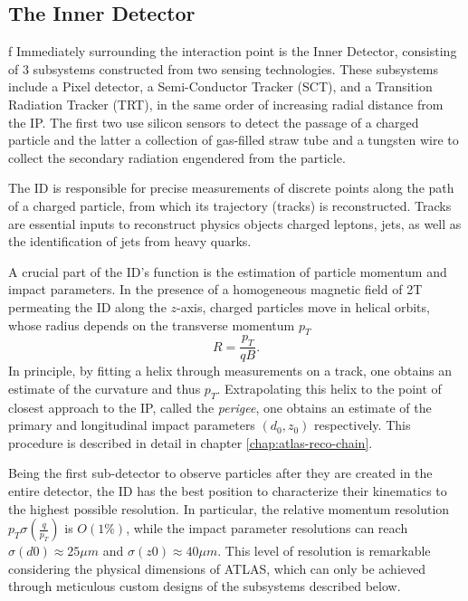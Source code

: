 \subsection{The Inner Detector}
\label{subsect:inner-detector}f
Immediately surrounding the interaction point is the Inner Detector, consisting of 3 subsystems constructed from two sensing technologies. These subsystems include a Pixel detector, a Semi-Conductor Tracker (SCT), and a Transition Radiation Tracker (TRT), in the same order of increasing radial distance from the IP. The first two use silicon sensors to detect the passage of a charged particle and the latter a collection of gas-filled straw tube and a tungsten wire to collect the secondary radiation engendered from the particle.

The ID is responsible for precise measurements of discrete points along the path of a charged particle, from which its trajectory (tracks) is reconstructed. Tracks are essential inputs to reconstruct physics objects charged leptons, jets, as well as the identification of jets from heavy quarks. 

A crucial part of the ID's function is the estimation of particle momentum and impact parameters. In the presence of a homogeneous magnetic field of 2T permeating the ID along the $z$-axis, charged particles move in helical orbits, whose radius depends on the transverse momentum $p_T$
\begin{equation}
    \label{eq:3.3}
    R = \frac{p_T}{qB}.
\end{equation}
In principle, by fitting a helix through measurements on a track, one obtains an estimate of the curvature and thus $p_T$. Extrapolating this helix to the point of closest approach to the IP, called the \textit{perigee}, one obtains an estimate of the primary and longitudinal impact parameters $(d_0, z_0)$ respectively. This procedure is described in detail in chapter \ref{chap:atlas-reco-chain}. 

Being the first sub-detector to observe particles after they are created in the entire detector, the ID has the best position to characterize their kinematics to the highest possible resolution. In particular, the relative momentum resolution $p_T\sigma(\frac{q}{p_T})$ is $O(1\%)$, while the impact parameter resolutions can reach $\sigma(d0)\approx 25\mu m$ and $\sigma(z0)\approx 40\mu m$. This level of resolution is remarkable considering the physical dimensions of ATLAS, which can only be achieved through meticulous custom designs of the subsystems described below.

